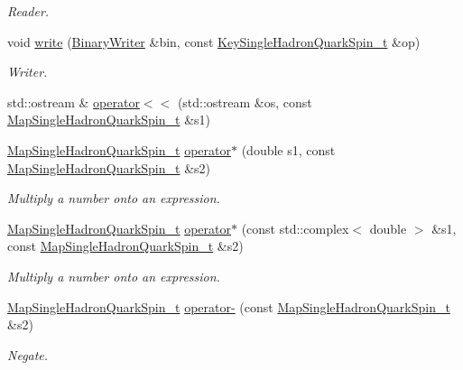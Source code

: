 \begin{DoxyCompactItemize}
\begin{DoxyCompactList}\small\item\em Reader. \end{DoxyCompactList}\item 
void \mbox{\hyperlink{namespaceHadron_a780fbaaa0f7e3ba3453b4994b3ecd7d0}{write}} (\mbox{\hyperlink{classADATIO_1_1BinaryWriter}{Binary\+Writer}} \&bin, const \mbox{\hyperlink{structHadron_1_1KeySingleHadronQuarkSpin__t}{Key\+Single\+Hadron\+Quark\+Spin\+\_\+t}} \&op)
\begin{DoxyCompactList}\small\item\em Writer. \end{DoxyCompactList}\item 
std\+::ostream \& \mbox{\hyperlink{namespaceHadron_af9e168289a71f406cf53d10783cc513c}{operator$<$$<$}} (std\+::ostream \&os, const \mbox{\hyperlink{namespaceHadron_a22279e56b59508dc8dd2c8991dc911fd}{Map\+Single\+Hadron\+Quark\+Spin\+\_\+t}} \&s1)
\item 
\mbox{\hyperlink{namespaceHadron_a22279e56b59508dc8dd2c8991dc911fd}{Map\+Single\+Hadron\+Quark\+Spin\+\_\+t}} \mbox{\hyperlink{namespaceHadron_a1ff2284ca0eec3b56aa1c075484c995f}{operator$\ast$}} (double s1, const \mbox{\hyperlink{namespaceHadron_a22279e56b59508dc8dd2c8991dc911fd}{Map\+Single\+Hadron\+Quark\+Spin\+\_\+t}} \&s2)
\begin{DoxyCompactList}\small\item\em Multiply a number onto an expression. \end{DoxyCompactList}\item 
\mbox{\hyperlink{namespaceHadron_a22279e56b59508dc8dd2c8991dc911fd}{Map\+Single\+Hadron\+Quark\+Spin\+\_\+t}} \mbox{\hyperlink{namespaceHadron_ab9e06323f5f25fbcb53926b3898935a6}{operator$\ast$}} (const std\+::complex$<$ double $>$ \&s1, const \mbox{\hyperlink{namespaceHadron_a22279e56b59508dc8dd2c8991dc911fd}{Map\+Single\+Hadron\+Quark\+Spin\+\_\+t}} \&s2)
\begin{DoxyCompactList}\small\item\em Multiply a number onto an expression. \end{DoxyCompactList}\item 
\mbox{\hyperlink{namespaceHadron_a22279e56b59508dc8dd2c8991dc911fd}{Map\+Single\+Hadron\+Quark\+Spin\+\_\+t}} \mbox{\hyperlink{namespaceHadron_af6e03647b0a1cac007a84d630c583dcb}{operator-\/}} (const \mbox{\hyperlink{namespaceHadron_a22279e56b59508dc8dd2c8991dc911fd}{Map\+Single\+Hadron\+Quark\+Spin\+\_\+t}} \&s2)
\begin{DoxyCompactList}\small\item\em Negate. \end{DoxyCompactList}\item 

\end{DoxyCompactItemize}
